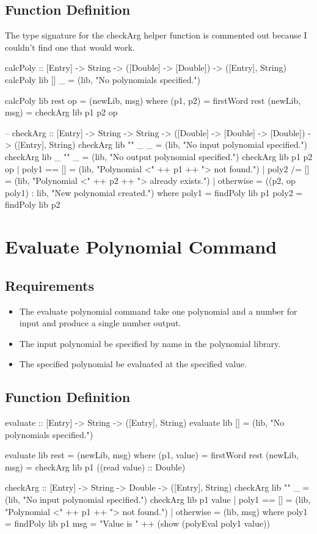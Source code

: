 \subsection{Function Definition}
The type signature for the checkArg helper function is commented out because I couldn't find one that would work.
\begin{code}
calcPoly :: [Entry] -> String -> ([Double] -> [Double]) -> ([Entry], String)
calcPoly lib [] _ = (lib, "No polynomials specified.")

calcPoly lib rest op = (newLib, msg)
  where
    (p1, p2) = firstWord rest
    (newLib, msg) = checkArg lib p1 p2 op

--    checkArg :: [Entry] -> String -> String -> ([Double] -> [Double] -> [Double]) -> ([Entry], String)
    checkArg lib "" _ _ = (lib, "No input polynomial specified.")
    checkArg lib _ "" _ = (lib, "No output polynomial specified.")
    checkArg lib p1 p2 op
      | poly1 == [] = (lib, "Polynomial <" ++ p1 ++ "> not found.")
      | poly2 /= [] = (lib, "Polynomial <" ++ p2 ++ "> already exists.")
      | otherwise   = ((p2, op poly1) : lib, "New polynomial created.")
      where
        poly1 = findPoly lib p1
        poly2 = findPoly lib p2
\end{code}

\section{Evaluate Polynomial Command}
\subsection{Requirements}
\begin{itemize}
\item The evaluate polynomial command  take one polynomial and a number for input and produce a single number output.
\item The input polynomial  be specified by name in the polynomial library.
\item The specified polynomial  be evaluated at the specified value.
\end{itemize}
\subsection{Function Definition}
\begin{code}
evaluate :: [Entry] -> String -> ([Entry], String)
evaluate lib [] = (lib, "No polynomials specified.")

evaluate lib rest = (newLib, msg)
  where
    (p1, value) = firstWord rest
    (newLib, msg) = checkArg lib p1 ((read value) :: Double)

    checkArg :: [Entry] -> String -> Double -> ([Entry], String)
    checkArg lib "" _ = (lib, "No input polynomial specified.")
    checkArg lib p1 value
      | poly1 == [] = (lib, "Polynomial <" ++ p1 ++ "> not found.")
      | otherwise   = (lib, msg)
      where
        poly1 = findPoly lib p1
        msg = "Value is " ++ (show (polyEval poly1 value))
\end{code}

